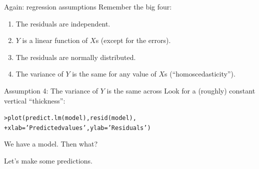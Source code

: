 \documentclass{beamer}\usepackage[]{graphicx}\usepackage[]{color}
\makeatletter
\newcommand{\hlstr}[1]{\textcolor[rgb]{1,0.894,0.71}{#1}}%
\newcommand{\hlstd}[1]{\textcolor[rgb]{1,0.894,0.769}{#1}}%
\newcommand{\hlkwc}[1]{\textcolor[rgb]{0.78,0.941,0.545}{#1}}%
\newcommand{\hlkwd}[1]{\textcolor[rgb]{1,0.78,0.769}{#1}}%
\newenvironment{kframe}{%
 \def\at@end@of@kframe{}%
 \ifinner\ifhmode%
  \def\at@end@of@kframe{\end{minipage}}%
  \begin{minipage}{\columnwidth}%
 \fi\fi%
 \def\FrameCommand##1{\hskip\@totalleftmargin \hskip-\fboxsep
 \colorbox{shadecolor}{##1}\hskip-\fboxsep
     \hskip-\linewidth \hskip-\@totalleftmargin \hskip\columnwidth}%
 \MakeFramed {\advance\hsize-\width
   \@totalleftmargin\z@ \linewidth\hsize
   \@setminipage}}%
 {\par\unskip\endMakeFramed%
 \at@end@of@kframe}
\newenvironment{knitrout}{}{} %
\makeatother
\begin{document}
\begin{darkframes}
    
    \begin{frame}{Again: regression assumptions}
      Remember the big four:
      \begin{enumerate}
        \item The residuals are independent.
        \item $Y$ is a linear function of $X$s (except for the errors).
        \item The residuals are normally distributed.
        \item \alert{The variance of $Y$ is the same for any value of $X$s (``homoscedasticity'').}
      \end{enumerate}
    \end{frame}
    
    
    \begin{frame}[fragile]{Assumption 4: The variance of $Y$ is the same across}
      Look for a (roughly) constant vertical ``thickness'':  
\begin{knitrout}
\begin{kframe}
\begin{alltt}
\hlstd{> }\hlkwd{plot}\hlstd{(}\hlkwd{predict.lm}\hlstd{(model),} \hlkwd{resid}\hlstd{(model),}
\hlstd{+ }  \hlkwc{xlab}\hlstd{=}\hlstr{'Predicted values'}\hlstd{,} \hlkwc{ylab}\hlstd{=}\hlstr{'Residuals'}\hlstd{)}
\end{alltt}
\end{kframe}


\end{knitrout}
    \end{frame}
    
    
    
    
    \begin{frame}[fragile]{We have a model. Then what?}
    
      Let's make some predictions.
    \end{frame}
    

\end{darkframes}
\end{document}
